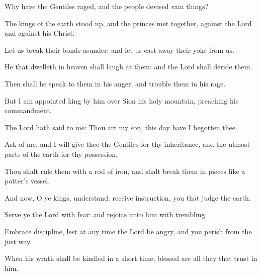 ﻿\item Why have the Gentiles raged, and the people devised vain things?
\item The kings of the earth stood up, and the princes met together, against the Lord and against his Christ.
\item Let us break their bonds asunder: and let us cast away their yoke from us.
\item He that dwelleth in heaven shall laugh at them: and the Lord shall deride them.
\item Then shall he speak to them in his anger, and trouble them in his rage.
\item But I am appointed king by him over Sion his holy mountain, preaching his commandment.
\item The Lord hath said to me: Thou art my son, this day have I begotten thee.
\item Ask of me, and I will give thee the Gentiles for thy inheritance, and the utmost parts of the earth for thy possession.
\item Thou shalt rule them with a rod of iron, and shalt break them in pieces like a potter's vessel.
\item And now, O ye kings, understand: receive instruction, you that judge the earth.
\item Serve ye the Lord with fear: and rejoice unto him with trembling.
\item Embrace discipline, lest at any time the Lord be angry, and you perish from the just way.
\item When his wrath shall be kindled in a short time, blessed are all they that trust in him.
